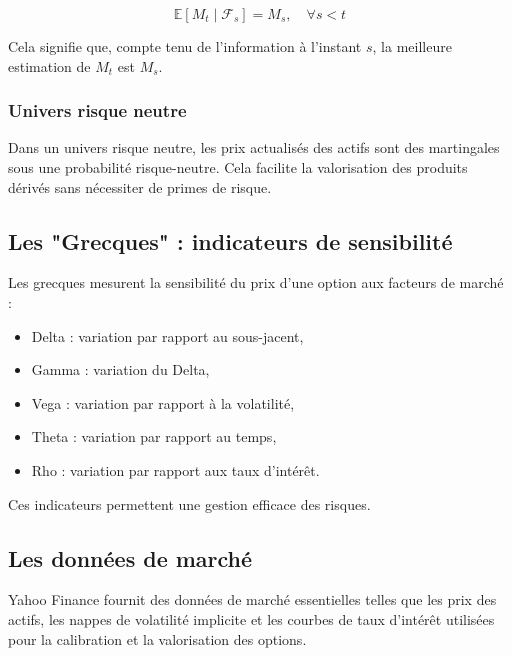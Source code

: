 \[
\mathbb{E}[M_t \mid \mathcal{F}_s] = M_s, \quad \forall s < t
\]

Cela signifie que, compte tenu de l'information à l'instant $s$, la meilleure estimation de $M_t$ est $M_s$.

\subsubsection{Univers risque neutre}
Dans un univers risque neutre, les prix actualisés des actifs sont des martingales sous une probabilité risque-neutre. Cela facilite la valorisation des produits dérivés sans nécessiter de primes de risque.

\subsection{Les "Grecques" : indicateurs de sensibilité}
Les \og grecques \fg{} mesurent la sensibilité du prix d'une option aux facteurs de marché :

\begin{itemize}
	\item Delta : variation par rapport au sous-jacent,
	\item Gamma : variation du Delta,
	\item Vega : variation par rapport à la volatilité,
	\item Theta : variation par rapport au temps,
	\item Rho : variation par rapport aux taux d'intérêt.
\end{itemize}

Ces indicateurs permettent une gestion efficace des risques.

\subsection{Les données de marché}
Yahoo Finance fournit des données de marché essentielles telles que les prix des actifs, les nappes de volatilité implicite et les courbes de taux d'intérêt utilisées pour la calibration et la valorisation des options.


